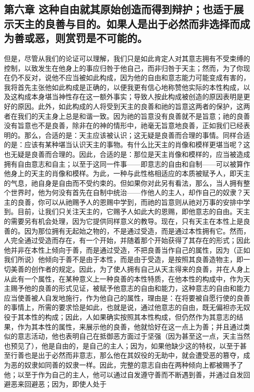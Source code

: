
\subsection{第六章 这种自由就其原始创造而得到辩护；也适于展示天主的良善与目的。如果人是出于必然而非选择而成为善或恶，则赏罚是不可能的。}

但是，尽管从我们的论证可以理解，我们只是如此肯定人对其意志拥有不受束缚的控制，以致发生在他身上的事应归咎于他自己，而非归咎于天主；然而，为了你现在仍不反对，说他不应当被如此构成，因为他的自由和意志能力可能变成有害的，我将首先主张他如此构成是正确的，以便我更有信心地称赞他实际的本性构成，以及这构成本身堪当神性存在这一额外事实；导致人按此构成被创造的原因表明是更好的原因。此外，如此构成的人将受到天主的良善和祂的旨意这两者的保护，这两者在我们的天主身上总是和谐一致。因为祂的旨意没有良善就不是旨意；祂的良善没有旨意也不是良善，除非在的神的情形中，祂毫无旨意地良善，正如我们已经表明的。那么，合适的是：天主应该被认识；这无疑是良善而合理的事情。同样合适的是：应该有某种堪当认识天主的事物。有什么比天主的肖像和模样更堪当呢？这也无疑是良善而合理的。因此，合适的是：那位是天主肖像和模样的，应当被造成拥有自由意志和自主；以至于这同一件事——即意志的自由和自制——可以被算作他身上的天主的肖像和模样。为此，一种与此性格相适应的本质被赋予人，即天主的气息，祂自身是自由而不受约束的。但如果你对此另有看法，那么，当人拥有整个世界时，他为何没有首先在自制中统治——作他人的主人，却作自己的奴隶？天主的良善，你可以从祂赐予人的恩赐中学到，而祂的旨意则从祂对万事的安排中学到。目前，让我们只关注天主的，它赐予人如此大的恩赐，即他意志的自由。天主的需要另有机会处理，因为它提供同样意义的教导。现在，只有天主在本性上是良善的。因为那位拥有无起始之物的，不是通过受造，而是通过本性拥有它。然而，人完全通过受造而存在，有一个开始，并随着那个开始获得了其存在的形式；因此他并非在本性上倾向于善，而是通过受造，不把良善当作自己的属性，因为（正如我们所说）他倾向于善不是由于本性，而是由于受造，是按照其良善造物主，即一切美善的创作者的规定。因此，为了使人拥有自己从天主得来的良善，并在人身上从此有一个属性，在某种意义上一种良善的本性特质，在他本性的构成中，作为天主赐予他的良善的形式见证，被赋予他意志的自由和能力，这种意志的自由和能力应当使善被人自发地施行，作为他自己的属性，理由是：在将要被自愿行使的良善的事情上，所需的要求恰是如此，也就是说，通过他意志的自由，既无偏袒亦无奴役于其本性的构成；因此，人如果确实按照其本性构成，但仍然作为其意志的结果，作为其本性的属性，来展示他的良善，他就恰好在这一点上为善；并且通过类似的意志活动，他也表明自己在抵御恶方面过于坚强（因为甚至这一点，天主当然也预见了），他是自由的，是自己的主人；因为，如果他缺少这的特权，以至于甚至行善也是出于必然而非意志，那么他在其奴役的无助中，就会遭受恶的篡夺，成为恶的奴隶如同善的奴隶一样。因此，完整的意志自由在两种倾向上都被赐予了他；以至于作为自己的主人，他可以通过自发遵守善而不断遇到善，并通过自发回避恶来回避恶；因为，即使人处于
